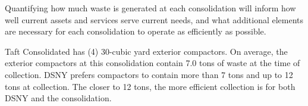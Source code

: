 
    Quantifying how much waste is generated at each consolidation will inform how well current assets and services serve current needs, and what additional elements are necessary for each consolidation to operate as efficiently as possible.
    
    Taft Consolidated has (4) 30-cubic yard exterior compactors. On average, the exterior compactors at this consolidation contain 7.0 tons of waste at the time of collection. DSNY prefers compactors to contain more than 7 tons and up to 12 tons at collection. The closer to 12 tons, the more efficient collection is for both DSNY and the consolidation.